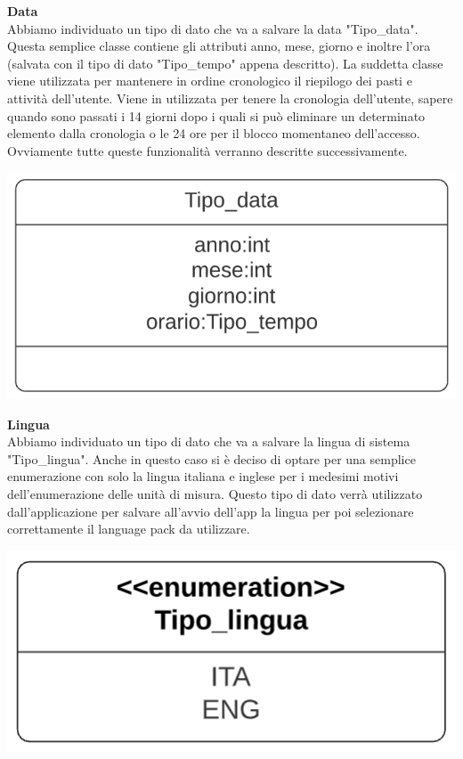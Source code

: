 \documentclass{article}
\begin{document}
      \hfill \break

      {\large\textbf{Data}}\\

      Abbiamo individuato un tipo di dato che va a salvare la data "Tipo\_data". Questa semplice classe contiene gli attributi anno, mese, giorno e
      inoltre l’ora (salvata con il tipo di dato "Tipo\_tempo" appena descritto). La suddetta classe viene utilizzata per mantenere in ordine
      cronologico il riepilogo dei pasti e attività dell’utente. Viene in utilizzata per tenere la cronologia dell’utente, sapere quando sono passati i 14 giorni
      dopo i quali si può eliminare un determinato elemento dalla cronologia o le 24 ore per il blocco momentaneo dell’accesso. Ovviamente tutte
      queste funzionalità verranno descritte successivamente.\\
      \begin{center}
            \includegraphics[scale=0.5]{classi/Tipo_data.png}
      \end{center}

      {\large\textbf{Lingua}}\\

      Abbiamo individuato un tipo di dato che va a salvare la lingua di sistema "Tipo\_lingua". Anche in questo caso si è deciso di optare per una
      semplice enumerazione con solo la lingua italiana e inglese per i medesimi motivi dell’enumerazione delle unità di misura. Questo tipo di
      dato verrà utilizzato dall’applicazione per salvare all’avvio dell’app la lingua per poi selezionare correttamente il language pack da
      utilizzare.\\
      \begin{center}
            \includegraphics[scale=0.5]{classi/Tipo_lingua.png}
      \end{center}
\end{document}
